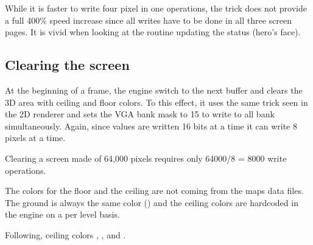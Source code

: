 While it is faster to write four pixel in one operations, the trick does not provide a full 400\% speed increase since all writes have to be done in all three screen pages. It is vivid when looking at the routine updating the status (hero's face).\\
\par
\begin{minipage}{\textwidth}

\end{minipage}



\subsection{Clearing the screen}
At the beginning of a frame, the engine switch to the next buffer and clears the 3D area with ceiling and floor colors. To this effect, it uses the same trick seen in the 2D renderer and sets the VGA bank mask to 15 to write to all bank simultaneously. Again, since values are written 16 bits at a time it can write 8 pixels at a time.\\ 
\par
\begin{minipage}{\textwidth}
 
 \end{minipage}
\par
Clearing a screen made of 64,000 pixels requires only 64000/8 = 8000 write operations.\\
\par
The colors for the floor and the ceiling are not coming from the maps data files. The ground is always the same color () and the ceiling colors are hardcoded in the engine on a per level basis.\\
\par
\begin{minipage}{\textwidth}
 
 \end{minipage}
\par


Following, ceiling colors , ,  and .\\ 
\par
{}






